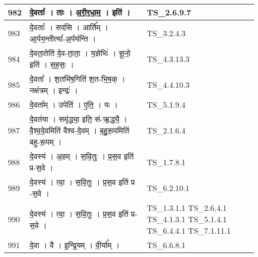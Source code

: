 \documentclass[17pt]{extarticle}
\begin{document}
\begin{longtable}{||p{0.4in}||p{4.9in}||p{0.9in}||}
    \hline
        
    982 & दे॒वताः᳚   ।   ताः   ।   अ॒री॒र॒धा॒म॒   ।   इति॑   ।    & TS\_2.6.9.7       \\
    
    \hline
        
    983 & दे॒वताः᳚   ।   सद॑सि   ।   आर्ति᳚म्   ।   आ॒र्पय॒न्तीत्या᳚{-}अ॒र्पय॑न्ति   ।    & TS\_3.2.4.3       \\
    
    \hline
        
    984 & दे॒वता॒तेति॑ दे॒व{-}ता॒ता॒   ।   य॒ज्ञेभिः॑   ।   सू॒नो॒ इति॑   ।   स॒ह॒सः॒   ।    & TS\_4.3.13.3       \\
    
    \hline
        
    985 & दे॒वता᳚   ।   श॒तभि॑ष॒गिति॑ श॒त{-}भि॒ष॒क्   ।   नक्ष॑त्रम्   ।   इन्द्रः॑   ।    & TS\_4.4.10.3       \\
    
    \hline
        
    986 & दे॒वता᳚म्   ।   उपेति॑   ।   ए॒ति॒   ।   यः   ।    & TS\_5.1.9.4       \\
    
    \hline
        
    987 & दे॒वत॑या   ।   समृ॑द्ध्या॒ इति॒ सं{-}ऋ॒द्ध्यै॒   ।   वै॒श्व॒दे॒वमिति॑ वैश्व{-}दे॒वम्   ।   ब॒हु॒रू॒पमिति॑ बहु{-}रू॒पम्   ।    & TS\_2.1.6.4       \\
    
    \hline
        
    988 & दे॒वस्य॑   ।   अ॒हम्   ।   स॒वि॒तुः   ।   प्र॒स॒व इति॑ प्र{-}स॒वे   ।    & TS\_1.7.8.1       \\
    
    \hline
        
    989 & दे॒वस्य॑   ।   त्वा॒   ।   स॒वि॒तुः   ।   प्र॒स॒व इति॑ प्र {-}स॒वे   ।    & TS\_6.2.10.1       \\
    
    \hline
        
    990 & दे॒वस्य॑   ।   त्वा॒   ।   स॒वि॒तुः   ।   प्र॒स॒व इति॑ प्र{-}स॒वे   ।    & TS\_1.3.1.1 TS\_2.6.4.1 TS\_4.1.3.1 TS\_5.1.4.1 TS\_6.4.4.1 TS\_7.1.11.1       \\
    
    \hline
        
    991 & दे॒वा   ।   वै   ।   इ॒न्द्रि॒यम्   ।   वी॒र्या᳚म्   ।    & TS\_6.6.8.1       \\
    
    \hline
        

\end{longtable}
\end{document}

